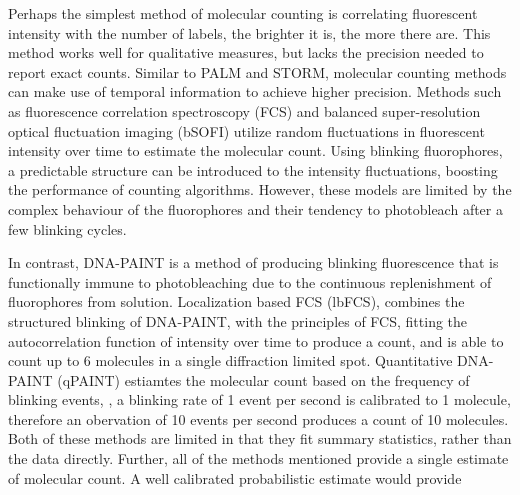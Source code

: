 
Perhaps the simplest method of molecular counting is correlating fluorescent
    intensity with the number of labels, \ie the brighter it is, the more there are.
    This method works well for qualitative measures, but lacks the precision needed 
    to report exact counts.
    Similar to PALM and STORM, molecular counting methods can make use of temporal information
    to achieve higher precision.
    Methods such as fluorescence correlation spectroscopy (FCS) and 
    balanced super-resolution optical fluctuation imaging (bSOFI)
    utilize random fluctuations in fluorescent intensity over time to estimate the molecular count.
    Using blinking fluorophores, a predictable structure can be introduced 
    to the intensity fluctuations, boosting the performance of counting algorithms.
    However, these models are limited by the complex behaviour of the fluorophores and their
    tendency to photobleach after a few blinking cycles. 


In contrast, DNA-PAINT is a method of producing blinking fluorescence that is functionally
    immune to photobleaching due to the continuous replenishment of fluorophores from solution.
    Localization based FCS (lbFCS), combines the structured blinking of DNA-PAINT, with the 
    principles of FCS, fitting the autocorrelation function of intensity over time to produce a count,
    and is able to count up to 6 molecules in a single diffraction limited spot.
    Quantitative DNA-PAINT (qPAINT) estiamtes the molecular count based on the frequency of blinking events, \ie, 
    a blinking rate of 1 event per second is calibrated to 1 molecule, therefore an obervation of 10 events per second
    produces a count of 10 molecules.
    Both of these methods are limited in that they fit summary statistics,
    rather than the data directly. 
    Further, all of the methods mentioned provide a single estimate of molecular count.
    A well calibrated probabilistic estimate would provide 
    
